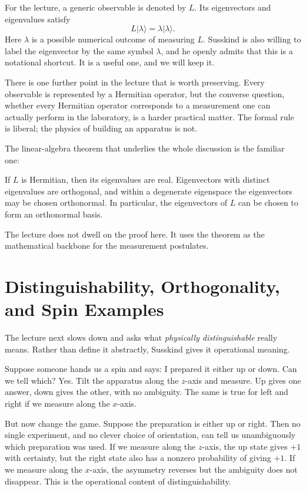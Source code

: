 For the lecture, a generic observable is denoted by \(L\). Its eigenvectors and eigenvalues satisfy
\begin{equation}
L|\lambda\rangle=\lambda|\lambda\rangle.
\end{equation}
Here \(\lambda\) is a possible numerical outcome of measuring \(L\). Susskind is also willing to label the eigenvector by the same symbol \(\lambda\), and he openly admits that this is a notational shortcut. It is a useful one, and we will keep it.

There is one further point in the lecture that is worth preserving. Every observable is represented by a Hermitian operator, but the converse question, whether every Hermitian operator corresponds to a measurement one can actually perform in the laboratory, is a harder practical matter. The formal rule is liberal; the physics of building an apparatus is not.

The linear-algebra theorem that underlies the whole discussion is the familiar one:

\begin{theorem}
If \(L\) is Hermitian, then its eigenvalues are real. Eigenvectors with distinct eigenvalues are orthogonal, and within a degenerate eigenspace the eigenvectors may be chosen orthonormal. In particular, the eigenvectors of \(L\) can be chosen to form an orthonormal basis.
\end{theorem}

The lecture does not dwell on the proof here. It uses the theorem as the mathematical backbone for the measurement postulates.

\section{Distinguishability, Orthogonality, and Spin Examples}

The lecture next slows down and asks what \emph{physically distinguishable} really means. Rather than define it abstractly, Susskind gives it operational meaning.

Suppose someone hands us a spin and says: I prepared it either up or down. Can we tell which? Yes. Tilt the apparatus along the \(z\)-axis and measure. Up gives one answer, down gives the other, with no ambiguity. The same is true for left and right if we measure along the \(x\)-axis.

But now change the game. Suppose the preparation is either up or right. Then no single experiment, and no clever choice of orientation, can tell us unambiguously which preparation was used. If we measure along the \(z\)-axis, the up state gives \(+1\) with certainty, but the right state also has a nonzero probability of giving \(+1\). If we measure along the \(x\)-axis, the asymmetry reverses but the ambiguity does not disappear. This is the operational content of distinguishability.

